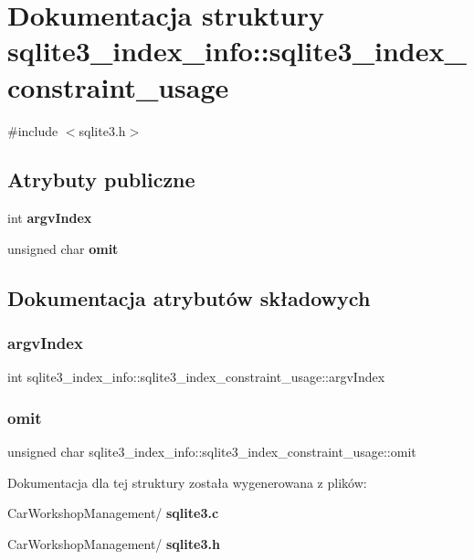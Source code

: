 \section{Dokumentacja struktury sqlite3\+\_\+index\+\_\+info\+::sqlite3\+\_\+index\+\_\+constraint\+\_\+usage}
\label{structsqlite3__index__info_1_1sqlite3__index__constraint__usage}


{\ttfamily \#include $<$sqlite3.\+h$>$}

\subsection*{Atrybuty publiczne}
\begin{DoxyCompactItemize}
\item 
int \textbf{ argv\+Index}
\item 
unsigned char \textbf{ omit}
\end{DoxyCompactItemize}


\subsection{Dokumentacja atrybutów składowych}
\mbox{\label{structsqlite3__index__info_1_1sqlite3__index__constraint__usage_a2cbf680033c2937b3de226e091743a94}} 
\subsubsection{argvIndex}
{\footnotesize\ttfamily int sqlite3\+\_\+index\+\_\+info\+::sqlite3\+\_\+index\+\_\+constraint\+\_\+usage\+::argv\+Index}

\mbox{\label{structsqlite3__index__info_1_1sqlite3__index__constraint__usage_ad07fa17d30e4fb3abe23ceaf84edf0ef}} 
\subsubsection{omit}
{\footnotesize\ttfamily unsigned char sqlite3\+\_\+index\+\_\+info\+::sqlite3\+\_\+index\+\_\+constraint\+\_\+usage\+::omit}



Dokumentacja dla tej struktury została wygenerowana z plików\+:\begin{DoxyCompactItemize}
\item 
Car\+Workshop\+Management/\textbf{ sqlite3.\+c}\item 
Car\+Workshop\+Management/\textbf{ sqlite3.\+h}\end{DoxyCompactItemize}
